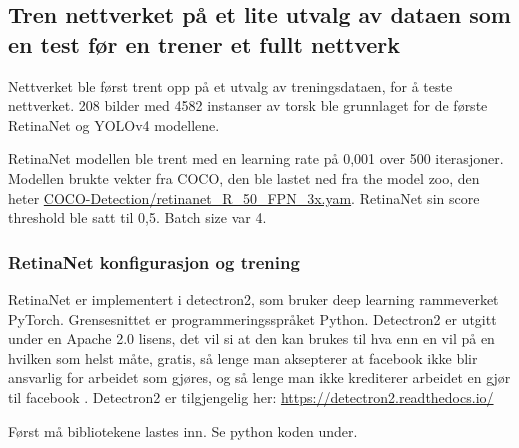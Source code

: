 \subsection{Tren nettverket på et lite utvalg av dataen som en test før en trener et fullt nettverk}

Nettverket ble først trent opp på et utvalg av treningsdataen, for å teste nettverket. 208 bilder med 4582 instanser av torsk ble grunnlaget for de første RetinaNet og YOLOv4 modellene.

RetinaNet modellen ble trent med en learning rate på 0,001 over 500 iterasjoner. Modellen brukte vekter fra COCO, den ble lastet ned fra the model zoo, den heter \url{COCO-Detection/retinanet_R_50_FPN_3x.yam}. RetinaNet sin score threshold ble satt til 0,5. Batch size var 4.

\subsubsection{RetinaNet konfigurasjon og trening}

RetinaNet er implementert i detectron2, som bruker deep learning rammeverket PyTorch. Grensesnittet er programmeringsspråket Python. Detectron2 er utgitt under en Apache 2.0 lisens, det vil si at den kan brukes til hva enn en vil på en hvilken som helst måte, gratis, så lenge man aksepterer at facebook ikke blir ansvarlig for arbeidet som gjøres, og så lenge man ikke krediterer arbeidet en gjør til facebook \cite{The Apache Software Foundation 2004}. Detectron2 er tilgjengelig her: \url{https://detectron2.readthedocs.io/}

Først må bibliotekene lastes inn. Se python koden under.

